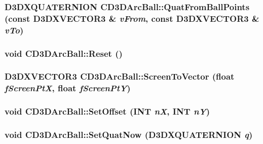 \label{class_c_d3_d_arc_ball_aab40fc2905516034b37ba0d14b6a6a76}
\hypertarget{class_c_d3_d_arc_ball_ab4ab2df9ad0ee6239a79bc826dc35249}{
\subsubsection[{QuatFromBallPoints}]{\setlength{\rightskip}{0pt plus 5cm}D3DXQUATERNION CD3DArcBall::QuatFromBallPoints (const D3DXVECTOR3 \& {\em vFrom}, \/  const D3DXVECTOR3 \& {\em vTo})}}
\label{class_c_d3_d_arc_ball_ab4ab2df9ad0ee6239a79bc826dc35249}
\hypertarget{class_c_d3_d_arc_ball_a8e25a9fee7bdad867cf8feb623a3dd1f}{
\subsubsection[{Reset}]{\setlength{\rightskip}{0pt plus 5cm}void CD3DArcBall::Reset ()}}
\label{class_c_d3_d_arc_ball_a8e25a9fee7bdad867cf8feb623a3dd1f}
\hypertarget{class_c_d3_d_arc_ball_a7c1d50c7a090b1b64ea528cddc1858dc}{
\subsubsection[{ScreenToVector}]{\setlength{\rightskip}{0pt plus 5cm}D3DXVECTOR3 CD3DArcBall::ScreenToVector (float {\em fScreenPtX}, \/  float {\em fScreenPtY})}}
\label{class_c_d3_d_arc_ball_a7c1d50c7a090b1b64ea528cddc1858dc}
\hypertarget{class_c_d3_d_arc_ball_a781313e96e3a63e69facead4ca70cf79}{
\subsubsection[{SetOffset}]{\setlength{\rightskip}{0pt plus 5cm}void CD3DArcBall::SetOffset (INT {\em nX}, \/  INT {\em nY})}}
\label{class_c_d3_d_arc_ball_a781313e96e3a63e69facead4ca70cf79}
\hypertarget{class_c_d3_d_arc_ball_ad3140af4e1b4f62a18238ac2991de9a6}{
\subsubsection[{SetQuatNow}]{\setlength{\rightskip}{0pt plus 5cm}void CD3DArcBall::SetQuatNow (D3DXQUATERNION {\em q})}}
